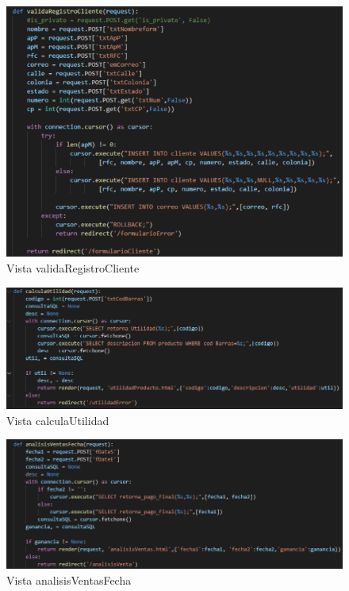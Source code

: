 \documentclass[12pt,letterpaper]{article}
\begin{document}
	\begin{figure}[H]
		\centering
		\includegraphics[scale=0.70]{Documentacion/img/validaRegistro.png}
		\caption{Vista validaRegistroCliente}
	\end{figure}
	
	\begin{figure}[H]
		\centering
		\includegraphics[scale=0.50]{Documentacion/img/def_CalculaUtilidad.png}
		\caption{Vista calculaUtilidad}
	\end{figure}
	
	\begin{figure}[H]
		\centering
		\includegraphics[scale=0.50]{Documentacion/img/def_AnalisisVenta.png}
		\caption{Vista analisisVentasFecha}
	\end{figure}
	
\end{document}
